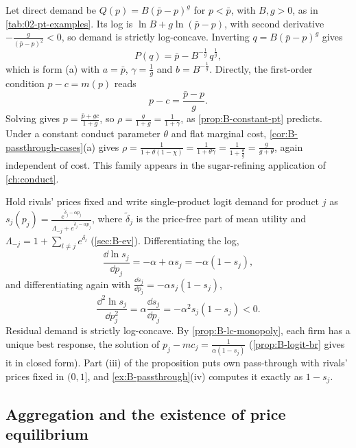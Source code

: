 \begin{example}\label{ex:B-power-demand}
Let direct demand be $Q(p) = B(\bar p - p)^{g}$ for $p < \bar p$, with $B, g > 0$, as in \cref{tab:02-pt-examples}. Its
log is $\ln B + g\ln(\bar p - p)$, with second derivative $-\frac{g}{(\bar p - p)^2} < 0$, so demand is strictly
log-concave. Inverting $q = B(\bar p - p)^{g}$ gives
\[
  P(q) = \bar p - B^{-\frac{1}{g}}\,q^{\frac{1}{g}},
\]
which is form (a) with $a = \bar p$, $\gamma = \frac{1}{g}$ and $b = B^{-\frac{1}{g}}$. Directly, the first-order
condition $p - c = m(p)$ reads
\[
  p - c = \frac{\bar p - p}{g}.
\]
Solving gives $p = \frac{\bar p + gc}{1 + g}$, so $\rho = \frac{g}{1 + g} = \frac{1}{1 + \gamma}$, as
\cref{prop:B-constant-pt} predicts. Under a constant conduct parameter $\theta$ and flat marginal cost,
\cref{cor:B-passthrough-cases}(a) gives $\rho = \frac{1}{1 + \theta(1 - \chi)} = \frac{1}{1 + \theta\gamma} = \frac{1}{1 + \frac{\theta}{g}} = \frac{g}{g + \theta}$,
again independent of cost. This family appears in the sugar-refining application of \cref{ch:conduct}.
\end{example}

\begin{example}\label{ex:B-logit-lc}
Hold rivals' prices fixed and write single-product logit demand for product $j$ as
$s_j(p_j) = \frac{e^{\tilde\delta_j - \alpha p_j}}{\Lambda_{-j} + e^{\tilde\delta_j - \alpha p_j}}$, where $\tilde\delta_j$ is the
price-free part of mean utility and $\Lambda_{-j} = 1 + \sum_{l \neq j}e^{\delta_l}$ (\cref{sec:B-ev}).
Differentiating the log,
\[
  \frac{\dd\ln s_j}{\dd p_j} = -\alpha + \alpha s_j = -\alpha(1 - s_j),
\]
and differentiating again with $\frac{\dd s_j}{\dd p_j} = -\alpha s_j(1 - s_j)$,
\[
  \frac{\dd^2\ln s_j}{\dd p_j^2} = \alpha\frac{\dd s_j}{\dd p_j} = -\alpha^2s_j(1 - s_j) < 0.
\]
Residual demand is strictly log-concave. By \cref{prop:B-lc-monopoly}, each firm has a unique best response,
the solution of $p_j - mc_j = \frac{1}{\alpha(1 - s_j)}$ (\cref{prop:B-logit-br} gives it in closed form). Part
(iii) of the proposition puts own pass-through with rivals' prices fixed in $(0, 1]$, and
\cref{ex:B-passthrough}(iv) computes it exactly as $1 - s_j$.
\end{example}

\subsection{Aggregation and the existence of price equilibrium}\label{sec:B-caplin-nalebuff}

